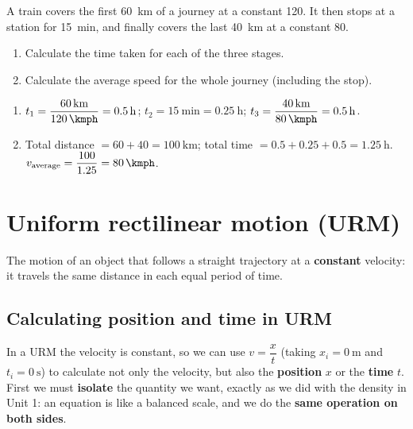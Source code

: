 \begin{exercise}
    A train covers the first \qty{60}{\km} of a journey at a constant \qty{120}{\kmph}. It then stops at a station for \qty{15}{\minute}, and finally covers the last \qty{40}{\km} at a constant \qty{80}{\kmph}.
    \begin{enumerate}[label=\letraminuscula]
        \item Calculate the time taken for each of the three stages.
        \item Calculate the average speed for the whole journey (including the stop).
    \end{enumerate}
    \begin{solu}
        \begin{enumerate}[label=\alph*)]
            \item \(t_1 = \dfrac{\qty{60}{\km}}{\qty{120}{\kmph}} = \qty{0.5}{\hour}\); \quad \(t_2 = \qty{15}{\minute} = \qty{0.25}{\hour}\); \quad \(t_3 = \dfrac{\qty{40}{\km}}{\qty{80}{\kmph}} = \qty{0.5}{\hour}\).
            \item Total distance \(= 60 + 40 = \qty{100}{\km}\); total time \(= 0.5 + 0.25 + 0.5 = \qty{1.25}{\hour}\). \\
            \(v_{\text{average}} = \dfrac{100}{1.25} = \qty{80}{\kmph}\).
        \end{enumerate}
    \end{solu}
\end{exercise}


\section{Uniform rectilinear motion (URM)}

\begin{definition}
    The motion of an object that follows a straight trajectory at a \textbf{constant} velocity: it travels the same distance in each equal period of time.
\end{definition}

\subsection{Calculating position and time in URM}

In a URM the velocity is constant, so we can use \(v = \dfrac{x}{t}\) (taking \(x_i = \qty{0}{\m}\) and \(t_i = \qty{0}{\s}\)) to calculate not only the velocity, but also the \textbf{position} \(x\) or the \textbf{time} \(t\). First we must \textbf{isolate} the quantity we want, exactly as we did with the density in Unit 1: an equation is like a balanced scale, and we do the \textbf{same operation on both sides}.

